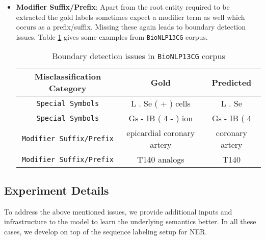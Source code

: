 \begin{itemize}
    \item \textbf{Modifier Suffix/Prefix}: Apart from the root entity required to be extracted the gold labels sometimes expect a modifier term as well which occurs as a prefix/suffix. Missing these again leads to boundary detection issues. Table \ref{tab:boundary_issue} gives some examples from \texttt{BioNLP13CG} corpus.
    
    \begin{table}[h!]
    \centering
    \begin{tabular}{|c|c|c|}\hline
    	\textbf{Misclassification Category} & \textbf{Gold} & \textbf{Predicted}\\\hline
    	\texttt{Special Symbols} & L . Se ( + ) cells & L . Se\\\hline
    	\texttt{Special Symbols} & Gs - IB ( 4 - ) ion & Gs - IB ( 4\\\hline
    	\texttt{Modifier Suffix/Prefix} & epicardial coronary artery & coronary artery\\\hline
    	\texttt{Modifier Suffix/Prefix} & T140 analogs & T140\\\hline
    	\end{tabular}
        \caption{Boundary detection issues in \texttt{BioNLP13CG} corpus}
        \label{tab:boundary_issue}
    \end{table}
\end{itemize}

\subsection{Experiment Details}

To address the above mentioned issues, we provide additional inputs and infrastructure to the model to learn the underlying semantics better. In all these cases, we develop on top of the sequence labeling setup for NER.


